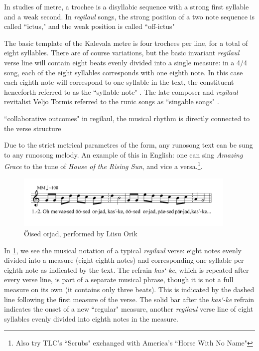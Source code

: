 In studies of metre, a trochee is a disyllabic sequence with a strong first syllable and a weak second. In {\it regilaul} songs, the strong position of a two note sequence is called ``ictus," and the weak position is called ``off-ictus"

 The basic template of the Kalevala metre is four trochees per line, for a total of eight syllables. There are of course variations, but the basic invariant {\it regilaul} verse line will contain eight beats evenly divided into a single measure: in a 4/4 song, each of the eight syllables corresponds with one eighth note. In this case each eighth note will correspond to one syllable in the text, the constituent henceforth referred to as the ``syllable-note" \citep{ruutelResultsComputerizedComparative1999}. The late composer and {\it regilaul} revitalist Veljo Tormis referred to the runic songs as ``singable songs" \citep{tormisProblemsThatRegilaul2007}. 
 
 ``collaborative outcomes" 
 in regilaul, the musical rhythm is directly connected to the verse structure \citep{orasMusicalManifestationsTextual2010}
 
 Due to the strict metrical parametres of the form, any runosong text can be sung to any runosong melody. An example of this in English: one can sing {\it Amazing Grace} to the tune of {\it House of the Rising Sun}, and vice a versa.\footnote{Also try TLC's ``Scrubs" exchanged with America's ``Horse With No Name"}. 
\begin{figure}[htb]
\begin{center}
\includegraphics[width=300pt]{figures/069.png}
\caption{Öised orjad, performed by Liisu Orik}
\label{song69}
\end{center}
\end{figure}

In \ref{song69}, we see the musical notation of a typical {\it regilaul} verse: eight notes evenly divided into a measure (eight eighth notes) and corresponding one syllable per eighth note as indicated by the text. The refrain {\it kas`-ke}, which is repeated after every verse line, is part of a separate musical phrase, though it is not a full measure on its own (it contains only three beats). This is indicated by the dashed line following the first measure of the verse. The solid bar after the {\it kas`-ke} refrain indicates the onset of a new ``regular" measure, another {\it regilaul} verse line of eight syllables evenly divided into eighth notes in the measure. 

